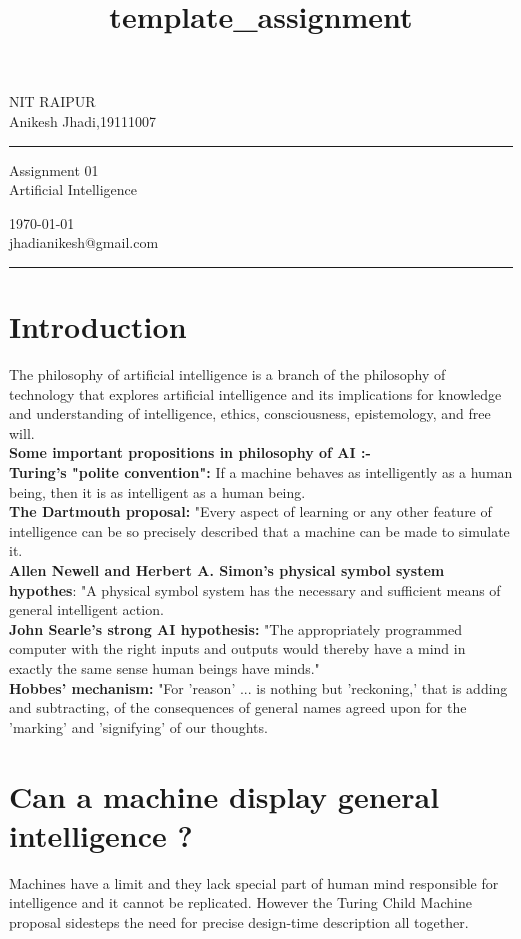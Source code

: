 \documentclass[a4paper,10pt]{article}
\begin{document}
\title{template_assignment} 
\fancyhead[C]{}
\begin{minipage}{0.295\textwidth} 
\raggedright
NIT RAIPUR\\ 
\footnotesize 
Anikesh Jhadi,19111007 
\medskip\hrule
\end{minipage}
\begin{minipage}{0.4\textwidth} 
\centering 
\large 
Assignment 01\\ 
\normalsize 
Artificial Intelligence\\ 
\end{minipage}
\begin{minipage}{0.295\textwidth} 
\raggedleft
\today\\ 
\footnotesize 
jhadianikesh@gmail.com
\medskip\hrule
\end{minipage}
\section{Introduction}
 The philosophy of artificial intelligence is a branch of the philosophy of technology that explores artificial intelligence and its implications for knowledge and understanding of intelligence, ethics, consciousness, epistemology, and free will.\\
\textbf {Some important propositions in philosophy of AI :- }\\
\textbf {Turing's "polite convention":} If a machine behaves as intelligently as a human being, then it is as intelligent as a human being. \\
\textbf {The Dartmouth proposal:} "Every aspect of learning or any other feature of intelligence can be so precisely described that a machine can be made to simulate it. \\
\textbf {Allen Newell and Herbert A. Simon's physical symbol system hypothes}: "A physical symbol system has the necessary and sufficient means of general intelligent action.\\
\textbf  {John Searle's strong AI hypothesis:}  "The appropriately programmed computer with the right inputs and outputs would thereby have a mind in exactly the same sense human beings have minds."\\
\textbf {Hobbes' mechanism: }"For 'reason' ... is nothing but 'reckoning,' that is adding and subtracting, of the consequences of general names agreed upon for the 'marking' and 'signifying' of our thoughts. \\
 \section{Can a machine display general intelligence ?}
Machines have a limit and they lack special part of human mind responsible for intelligence and it cannot be replicated.
However the Turing Child Machine proposal sidesteps the need for precise design-time description all together. 
\end{document}
